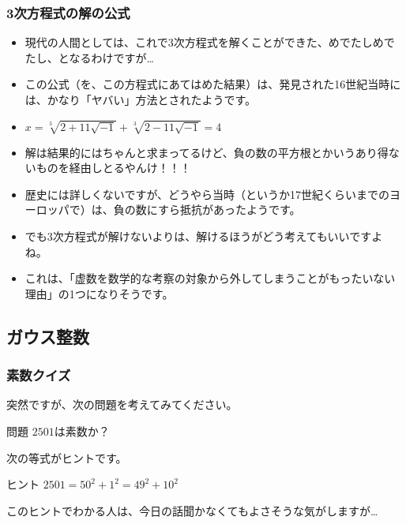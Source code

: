 \documentclass[dvipdfmx]{beamer}
\begin{document}
  \begin{frame}
    \frametitle{3次方程式の解の公式}

    \begin{itemize}
      \item 現代の人間としては、これで3次方程式を解くことができた、めでたしめでたし、となるわけですが…
      \item この公式（を、この方程式にあてはめた結果）は、発見された16世紀当時には、かなり「ヤバい」方法とされたようです。
      \item $x = \sqrt[3]{2 + 11\sqrt{-1}} + \sqrt[3]{2 - 11\sqrt{-1}} = 4$

      \pause

      \item 解は結果的にはちゃんと求まってるけど、\alert{負の数の平方根とかいうあり得ないもの}を経由しとるやんけ！！！

      \pause

      \item 歴史には詳しくないですが、どうやら当時（というか17世紀くらいまでのヨーロッパで）は、\alert{負の数にすら抵抗}があったようです。
      \item でも3次方程式が解けないよりは、解けるほうがどう考えてもいいですよね。
      \item これは、「虚数を数学的な考察の対象から外してしまうことがもったいない理由」の1つになりそうです。
    \end{itemize}

  \end{frame}

  \subsection{ガウス整数}

  \begin{frame}
    \frametitle{素数クイズ}

    突然ですが、次の問題を考えてみてください。
    \begin{block}{問題}
      $2501$は素数か？
    \end{block}

    \pause

    次の等式がヒントです。
    \begin{block}{ヒント}
      $2501 = 50^2 + 1^2 = 49^2 + 10^2$
    \end{block}
    このヒントでわかる人は、今日の話聞かなくてもよさそうな気がしますが…

  \end{frame}
\end{document}
